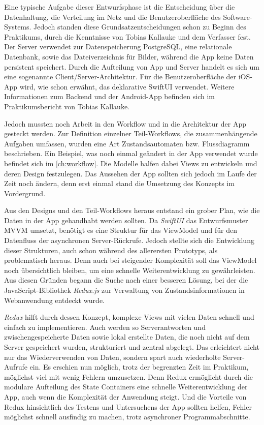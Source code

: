\documentclass[notables, nomenclature, oneside, 150]{HSMW-Thesis}
\begin{document}
		Eine typische Aufgabe dieser Entwurfsphase ist die Entscheidung über die Datenhaltung, die Verteilung im Netz und die Benutzeroberfläche des Software-Systems. Jedoch standen diese Grundsatzentscheidungen schon zu Beginn des Praktikums, durch die Kenntnisse von Tobias Kallauke und dem Verfasser fest. Der Server verwendet zur Datenspeicherung PostgreSQL, eine relationale Datenbank, sowie das Dateiverzeichnis für Bilder, während die App keine Daten persistent speichert. Durch die Aufteilung von App und Server handelt es sich um eine sogenannte Client/Server-Architektur. Für die Benutzeroberfläche der iOS-App wird, wie schon erwähnt, das deklarative SwiftUI verwendet. Weitere Informationen zum Backend und der Android-App befinden sich im Praktikumsbericht von Tobias Kallauke.
		
		Jedoch mussten noch Arbeit in den Workflow und in die Architektur der App gesteckt werden. Zur Definition einzelner Teil-Workflows, die zusammenhängende Aufgaben umfassen, wurden eine Art Zustandsautomaten bzw. Flussdiagramm beschrieben. Ein Beispiel, was noch einmal geändert in der App verwendet wurde befindet sich im \autoref{ch:workflow}. Die Modelle halfen dabei Views zu entwickeln und deren Design festzulegen. Das Aussehen der App sollten sich jedoch im Laufe der Zeit noch ändern, denn erst einmal stand die Umsetzung des Konzepts im Vordergrund.

		Aus den Designs und den Teil-Workflows heraus entstand ein grober Plan, wie die Daten in der App gehandhabt werden sollten. Da \textit{SwiftUI} das Entwurfsmuster MVVM umsetzt, benötigt es eine Struktur für das ViewModel und für den Datenfluss der asynchronen Server-Rückrufe. Jedoch stellte sich die Entwicklung dieser Strukturen, auch schon während des allerersten Prototyps, als problematisch heraus. Denn auch bei steigender Komplexität soll das ViewModel noch übersichtlich bleiben, um eine schnelle Weiterentwicklung zu gewährleisten. Aus diesen Gründen begann die Suche nach einer besseren Lösung, bei der die JavaScript-Bibliothek \textit{Redux.js} zur Verwaltung von Zustandsinformationen in Webanwendung entdeckt wurde. 

		\textit{Redux} hilft durch dessen Konzept, komplexe Views mit vielen Daten schnell und einfach zu implementieren. Auch werden so Serverantworten und zwischengespeicherte Daten sowie lokal erstellte Daten, die noch nicht auf dem Server gespeichert wurden, strukturiert und zentral abgelegt. Das erleichtert nicht nur das Wiederverwenden von Daten, sondern spart auch wiederholte Server-Aufrufe ein. Es erschien nun möglich, trotz der begrenzten Zeit im Praktikum, möglichst viel mit wenig Fehlern umzusetzen. Denn Redux ermöglicht durch die modulare Aufteilung des State Containers eine schnelle Weiterentwicklung der App, auch wenn die Komplexität der Anwendung steigt. Und die Vorteile von Redux hinsichtlich des Testens und Untersuchens der App sollten helfen, Fehler möglichst schnell ausfindig zu machen, trotz asynchroner Programmabschnitte.
\end{document}
